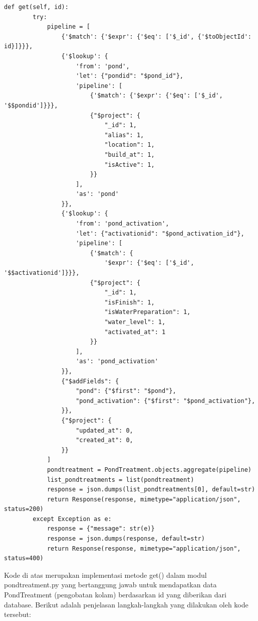 \begin{enumerate}[1.]
\begin{lstlisting}
def get(self, id):
        try:
            pipeline = [
                {'$match': {'$expr': {'$eq': ['$_id', {'$toObjectId': id}]}}},
                {'$lookup': {
                    'from': 'pond',
                    'let': {"pondid": "$pond_id"},
                    'pipeline': [
                        {'$match': {'$expr': {'$eq': ['$_id', '$$pondid']}}},
                        {"$project": {
                            "_id": 1,
                            "alias": 1,
                            "location": 1,
                            "build_at": 1,
                            "isActive": 1,
                        }}
                    ],
                    'as': 'pond'
                }},
                {'$lookup': {
                    'from': 'pond_activation',
                    'let': {"activationid": "$pond_activation_id"},
                    'pipeline': [
                        {'$match': {
                            '$expr': {'$eq': ['$_id', '$$activationid']}}},
                        {"$project": {
                            "_id": 1,
                            "isFinish": 1,
                            "isWaterPreparation": 1,
                            "water_level": 1,
                            "activated_at": 1
                        }}
                    ],
                    'as': 'pond_activation'
                }},
                {"$addFields": {
                    "pond": {"$first": "$pond"},
                    "pond_activation": {"$first": "$pond_activation"},
                }},
                {"$project": {
                    "updated_at": 0,
                    "created_at": 0,
                }}
            ]
            pondtreatment = PondTreatment.objects.aggregate(pipeline)
            list_pondtreatments = list(pondtreatment)
            response = json.dumps(list_pondtreatments[0], default=str)
            return Response(response, mimetype="application/json", status=200)
        except Exception as e:
            response = {"message": str(e)}
            response = json.dumps(response, default=str)
            return Response(response, mimetype="application/json", status=400)
\end{lstlisting}


Kode di atas merupakan implementasi metode get() dalam modul pondtreatment.py yang bertanggung jawab untuk mendapatkan data PondTreatment (pengobatan kolam) berdasarkan id yang diberikan dari database. Berikut adalah penjelasan langkah-langkah yang dilakukan oleh kode tersebut:


\end{enumerate}
